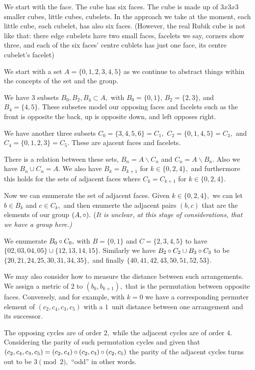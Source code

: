{%
We start with the face.  The cube has six faces.  The cube is made up of $3x3x3$ smaller
cubes, little cubes, cubelets.  In the approach we take at the moment, each little cube,
each cubelet, has also six faces. (However, the real Rubik cube is not like that: there
edge cubelets have two small faces, facelets we say, corners show three, and each of
the six faces' centre cublets has just one face, its centre cubelet's facelet)

We start with a set $A=\{0,1,2,3,4,5\}$ as we continue to abstract
things within the concepts of the set and the group.

We have $3$ subsets $B_0,B_2,B_4\subset A,$ with $B_0=\{0,1\}$, $B_2=\{2,3\}$, and
$B_4=\{4,5\}.$  These subsetes model our opposing faces and facelets such as
the front is opposite the back, up is opposite down, and left opposes right.

We have another three subsets $C_0=\{3,4,5,6\}=C_1,$ $C_2=\{0,1,4,5\}=C_3,$ and
$C_4=\{0,1,2,3\}=C_5.$ These are ajacent faces and facelets.

There is a relation between these sets, $B_n=A\backslash C_n$ and $C_n=A\backslash B_n.$
Also we have $B_n\cup C_n=A.$  We also have $B_k=B_{k+1}$ for $k\in\{0,2,4\},$ and
furthermore this holds for the sets of adjacent faces where
$C_k=C_{k+1}$ for $k\in\{0,2,4\}.$

\e Now we can enumerate the set of adjacent faces.  Given $k\in\{0,2,4\},$ we can
let $b\in B_k$ and $c\in C_k,$ and then enumerte the adjacent pairs $(b,c)$ that
are the elements of our group $(A,\circ).$  {(\it It is unclear, at this stage of
considerations, that we have a group here.)}

We enumerate $B_0\circ C_0,$ with $B=\{0,1\}$ and $C=\{2,3,4,5\}$ to have
$\{02,03,04,05\}\cup\{12,13,14,15\}.$
Similarly we have $B_2\circ C_2\cup B_3\circ C_3$ to be
$\{20,21,24,25,30,31,34,35\},$ and finally
$\{40,41,42,43,50,51,52,53\}.$

\e We may also consider how to measure the distance between such arrangements.
We assign a metric of $2$ to $(b_k,b_{k+1}),$ that is the permutation between
opposite faces.
Conversely, and for example, with $k=0$ we have a corresponding permuter element
of $(c_2,c_4,c_3,c_5)$ with a $1$~unit distance between one arrangement and its
successor.

The opposing cycles are of order $2,$ while the adjacent cycles are of order $4.$
Considering the parity of such permutation cycles and given that  $(c_2,c_4,c_3,c_5)=(c_2,c_4)\circ(c_2,c_3)\circ(c_2,c_5)$ the parity of the adjacent cycles turns out to be $3\pmod 2,$
``odd'' in other words.

}%
\bye

